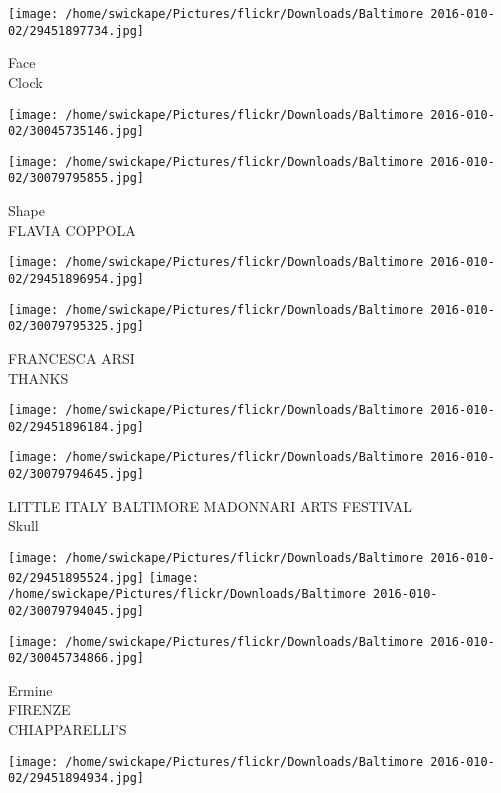 \documentclass[10pt,letterpaper]{article}
\begin{document}
\vspace{0.25in}
\texttt{[image: /home/swickape/Pictures/flickr/Downloads/Baltimore 2016-010-02/29451897734.jpg]}

Face\\
Clock
\pagebreak

\texttt{[image: /home/swickape/Pictures/flickr/Downloads/Baltimore 2016-010-02/30045735146.jpg]}

\vspace{0.25in}
\texttt{[image: /home/swickape/Pictures/flickr/Downloads/Baltimore 2016-010-02/30079795855.jpg]}

Shape\\
FLAVIA COPPOLA
\pagebreak

\texttt{[image: /home/swickape/Pictures/flickr/Downloads/Baltimore 2016-010-02/29451896954.jpg]}

\vspace{0.25in}
\texttt{[image: /home/swickape/Pictures/flickr/Downloads/Baltimore 2016-010-02/30079795325.jpg]}

FRANCESCA ARSI\\
THANKS
\pagebreak

\texttt{[image: /home/swickape/Pictures/flickr/Downloads/Baltimore 2016-010-02/29451896184.jpg]}

\vspace{0.25in}
\texttt{[image: /home/swickape/Pictures/flickr/Downloads/Baltimore 2016-010-02/30079794645.jpg]}

LITTLE ITALY BALTIMORE MADONNARI ARTS FESTIVAL\\
Skull
\pagebreak

\texttt{[image: /home/swickape/Pictures/flickr/Downloads/Baltimore 2016-010-02/29451895524.jpg]}
\texttt{[image: /home/swickape/Pictures/flickr/Downloads/Baltimore 2016-010-02/30079794045.jpg]}

\vspace{0.25in}
\texttt{[image: /home/swickape/Pictures/flickr/Downloads/Baltimore 2016-010-02/30045734866.jpg]}

Ermine\\
FIRENZE\\
CHIAPPARELLI'S
\pagebreak

\texttt{[image: /home/swickape/Pictures/flickr/Downloads/Baltimore 2016-010-02/29451894934.jpg]}
\end{document}
